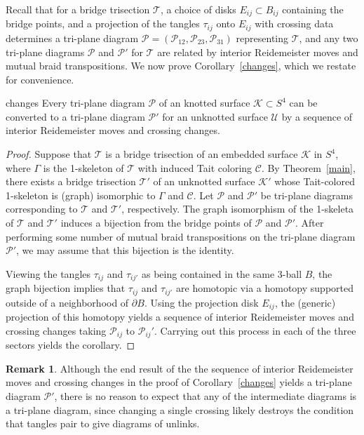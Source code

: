 \documentclass[11pt, oneside]{amsart}
\theoremstyle{theorem}
\theoremstyle{definition}
\newtheorem{remark}[theorem]{Remark}
\newcommand{\pd}{\partial}
\newcommand{\Pau}{\mathcal{P}}
\newcommand{\K}{\mathcal{K}}
\newcommand{\T}{\mathcal{T}}
\theoremstyle{theorem}
\begin{document}
Recall that for a bridge trisection $\mathcal T$, a choice of disks $E_{ij} \subset B_{ij}$ containing the bridge points, and a projection of the tangles $\tau_{ij}$ onto $E_{ij}$ with crossing data determines a tri-plane diagram $\Pau = (\Pau_{12},\Pau_{23},\Pau_{31})$ representing $\T$, and any two tri-plane diagrams $\Pau$ and $\Pau'$ for $\T$ are related by interior Reidemeister moves and mutual braid transpositions.  We now prove Corollary~\ref{changes}, which we restate for convenience.

\begin{repcorollary}{changes}
Every tri-plane diagram $\mathcal P$ of an knotted surface $\mathcal K \subset S^4$ can be converted to a tri-plane diagram $\mathcal P'$ for an unknotted surface $\mathcal U$ by a sequence of interior Reidemeister moves and crossing changes.
\end{repcorollary}

\begin{proof}
Suppose that $\T$ is a bridge trisection of an embedded surface $\K$ in $S^4$, where $\Gamma$ is the 1-skeleton of $\T$ with induced Tait coloring $\mathcal{C}$.  By Theorem~\ref{main}, there exists a bridge trisection $\T'$ of an unknotted surface $\K'$ whose Tait-colored 1-skeleton is (graph) isomorphic to $\Gamma$ and $\mathcal{C}$.  Let $\Pau$ and $\Pau'$ be tri-plane diagrams corresponding to $\T$ and $\T'$, respectively.  The graph isomorphism of the 1-skeleta of $\T$ and $\T'$ induces a bijection from the bridge points of $\Pau$ and $\Pau'$.  After performing some number of mutual braid transpositions on the tri-plane diagram $\Pau'$, we may assume that this bijection is the identity.

Viewing the tangles $\tau_{ij}$ and $\tau_{ij'}$ as being contained in the same 3-ball $B$, the graph bijection implies that $\tau_{ij}$ and $\tau_{ij'}$ are homotopic via a homotopy supported outside of a neighborhood of $\pd B$.  Using the projection disk $E_{ij}$, the (generic) projection of this homotopy yields a sequence of interior Reidemeister moves and crossing changes taking $\Pau_{ij}$ to $\Pau_{ij}'$.  Carrying out this process in each of the three sectors yields the corollary.
\end{proof}

\begin{remark}
\label{rmk:crossings}
	Although the end result of the the sequence of interior Reidemeister moves and crossing changes in the proof of Corollary~\ref{changes} yields a tri-plane diagram $\Pau'$, there is no reason to expect that any of the intermediate diagrams is a tri-plane diagram, since changing a single crossing likely destroys the condition that tangles pair to give diagrams of unlinks.
\end{remark}
\end{document}
